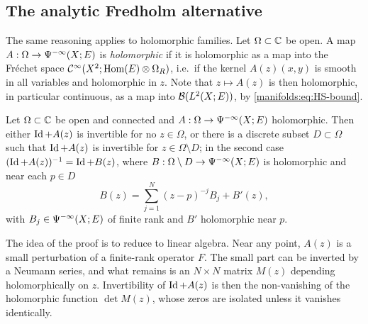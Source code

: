 \subsection{The analytic Fredholm alternative}
The same reasoning applies to holomorphic families. Let $\Omega\subset\mathbb{C}$ be open.
A map $A:\Omega\to\Psi^{-\infty}(X;E)$ is \emph{holomorphic} if it is holomorphic as
a map into the Fr\'echet space $\mathcal{C}^\infty(X^2;\operatorname{Hom}(E)\otimes\Omega_R)$, i.e.\ if the kernel
$A(z)(x,y)$ is smooth in all variables and holomorphic in $z$. Note that
$z\mapsto A(z)$ is then holomorphic, in particular continuous, as a map into
$\mathcal{B}(L^2(X;E))$, by \eqref{manifolds:eq:HS-bound}.

\begin{proposition}\label{manifolds:prop:analytic-fredholm}
Let $\Omega\subset\mathbb{C}$ be open and connected and $A:\Omega\to\Psi^{-\infty}(X;E)$
holomorphic. Then either $\operatorname{Id}+A(z)$ is invertible for no $z\in\Omega$, or there is a
discrete subset $D\subset\Omega$ such that $\operatorname{Id}+A(z)$ is invertible for $z\in\Omega\setminus D$;
in the second case $(\operatorname{Id}+A(z))^{-1}=\operatorname{Id}+B(z)$, where $B:\Omega\setminus D\to\Psi^{-\infty}(X;E)$ is
holomorphic and near each $p\in D$
\begin{equation*}
B(z)=\sum_{j=1}^N(z-p)^{-j}B_j+B'(z),
\end{equation*}
with $B_j\in\Psi^{-\infty}(X;E)$ of finite rank and $B'$ holomorphic near $p$.
\end{proposition}

The idea of the proof is to reduce to linear algebra. Near any point,
$A(z)$ is a small perturbation of a finite-rank operator $F$. The small part
can be inverted by a Neumann series, and what remains is an $N\times N$
matrix $M(z)$ depending holomorphically on $z$. Invertibility of $\operatorname{Id}+A(z)$ is
then the non-vanishing of the holomorphic function $\det M(z)$, whose zeros
are isolated unless it vanishes identically.


